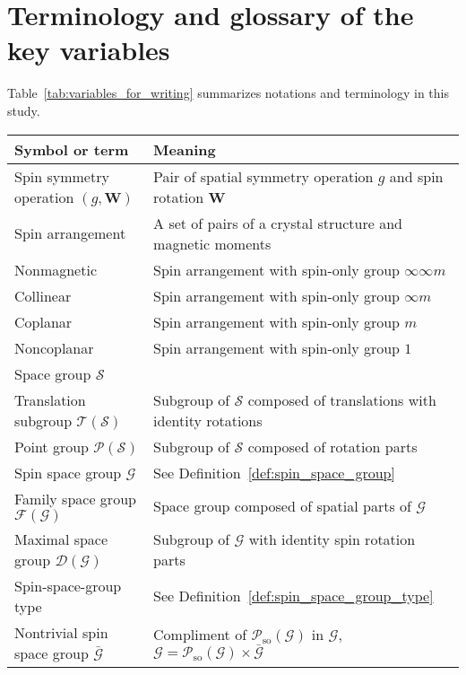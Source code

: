 \section{Terminology and glossary of the key variables}

Table~\ref{tab:variables_for_writing} summarizes notations and terminology in this study.

\begin{table*}[tb]
    \centering
    \caption{Notation and terminology}
    \label{tab:variables_for_writing}
    \begin{tabular}{ll}
        \hline\hline
        Symbol or term & Meaning \\ \hline
        Spin symmetry operation $(g, \bm{W})$ & Pair of spatial symmetry operation $g$ and spin rotation $\bm{W}$ \\
        \hline
        Spin arrangement & A set of pairs of a crystal structure and magnetic moments \\
        Nonmagnetic & Spin arrangement with spin-only group $\infty \infty m$ \\
        Collinear & Spin arrangement with spin-only group $\infty m$ \\
        Coplanar & Spin arrangement with spin-only group $m$ \\
        Noncoplanar & Spin arrangement with spin-only group $1$ \\
        \hline
        Space group $\mathcal{S}$ & \\
        Translation subgroup $\mathcal{T}(\mathcal{S})$ & Subgroup of $\mathcal{S}$ composed of translations with identity rotations \\
        Point group $\mathcal{P}(\mathcal{S})$ & Subgroup of $\mathcal{S}$ composed of rotation parts \\
        \hline
        Spin space group $\mathcal{G}$ & See Definition~\ref{def:spin_space_group} \\
        Family space group $\mathcal{F}(\mathcal{G})$ & Space group composed of spatial parts of $\mathcal{G}$ \\
        Maximal space group $\mathcal{D}(\mathcal{G})$ & Subgroup of $\mathcal{G}$ with identity spin rotation parts \\
        Spin-space-group type & See Definition~\ref{def:spin_space_group_type} \\
        Nontrivial spin space group $\bar{\mathcal{G}}$ & Compliment of $\mathcal{P}_{\mathrm{so}}(\mathcal{G})$ in $\mathcal{G}$, $\mathcal{G} = \mathcal{P}_{\mathrm{so}}(\mathcal{G}) \times \bar{\mathcal{G}}$ \\

\end{tabular}
\end{table*}
